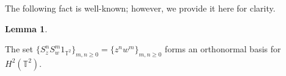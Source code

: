 \documentclass[12pt,reqno]{amsart}
\theoremstyle{definition}
\theoremstyle{definition}
\newtheorem{lemma}[theorem]{Lemma}
\numberwithin{equation}{section}
\begin{document}
The following fact is well-known; however, we provide it here for clarity. 
\begin{lemma} \label{pars}

The set $\{S_{z}^n S_{w}^m {1}_{\mathbb{T}^2}\}_{m,n \geq 0} = \{z^nw^m\}_{m,n \geq 0}$  forms an orthonormal basis for $H^2(\mathbb{T}^2)$.
\end{lemma}

\end{document}
